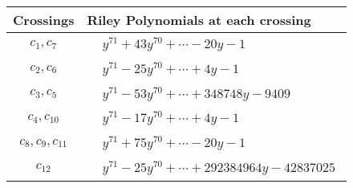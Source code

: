 \documentclass[1p]{elsarticle_modified}
\theoremstyle{definition}
\begin{document}
\begin{tabular}{m{50pt}|m{274pt}}
Crossings & \hspace{64pt}Riley Polynomials at each crossing \\
\hline $$\begin{aligned}c_{1},c_{7}\end{aligned}$$&$\begin{aligned}
&y^{71}+43 y^{70}+\cdots-20 y-1
\end{aligned}$\\
\hline $$\begin{aligned}c_{2},c_{6}\end{aligned}$$&$\begin{aligned}
&y^{71}-25 y^{70}+\cdots+4 y-1
\end{aligned}$\\
\hline $$\begin{aligned}c_{3},c_{5}\end{aligned}$$&$\begin{aligned}
&y^{71}-53 y^{70}+\cdots+348748 y-9409
\end{aligned}$\\
\hline $$\begin{aligned}c_{4},c_{10}\end{aligned}$$&$\begin{aligned}
&y^{71}-17 y^{70}+\cdots+4 y-1
\end{aligned}$\\
\hline $$\begin{aligned}c_{8},c_{9},c_{11}\end{aligned}$$&$\begin{aligned}
&y^{71}+75 y^{70}+\cdots-20 y-1
\end{aligned}$\\
\hline $$\begin{aligned}c_{12}\end{aligned}$$&$\begin{aligned}
&y^{71}-25 y^{70}+\cdots+292384964 y-42837025
\end{aligned}$\\
\hline
\end{tabular}
\vskip 2pc
\end{document}
